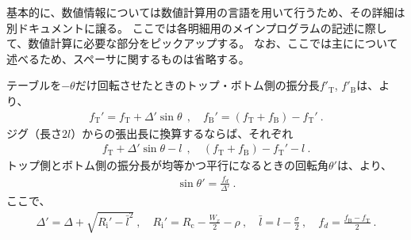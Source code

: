 




基本的に、数値情報については数値計算用の言語を用いて行うため、その詳細は別ドキュメントに譲る。
ここでは各明細用のメインプログラムの記述に際して、数値計算に必要な部分をピックアップする。
なお、ここでは主に\DMname について述べるため、スペーサに関するものは省略する。


テーブルを$-\theta$だけ回転させたときのトップ・ボトム側の振分長$f'_\mathrm T$, $f'_\mathrm B$は、より、
\begin{align*}
  f_\mathrm T' = f_\mathrm T+\varDelta'\!\sin\theta~~, \quad
  f_\mathrm B' = (f_\mathrm T+f_\mathrm B)-f_\mathrm T'\ .
\end{align*}
ジグ（長さ$2l$）からの張出長に換算するならば、それぞれ
\begin{align*}
  f_\mathrm T+\varDelta'\!\sin\theta-l~~, \quad
  (f_\mathrm T+f_\mathrm B)-f_\mathrm T'-l\ .
\end{align*}
トップ側とボトム側の振分長が均等かつ平行になるときの回転角$\theta'$は、より、
\begin{align*}
  \sin\theta' = \frac{f_d}{\varDelta'}\ .
\end{align*}
ここで、
\begin{align*}
  \varDelta' = \varDelta+\sqrt{R_\mathrm i'-\bar l^2}\ , \quad
  R_\mathrm i' = R_\mathrm c-\frac{W_x}2-\rho\ ,\quad
  \bar l = l-\frac\sigma2\ ,\quad
  f_d = \frac{f_\mathrm B-f_\mathrm T}2\ .
\end{align*}



